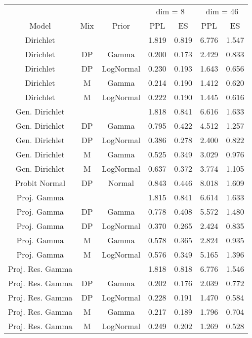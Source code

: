 
\begin{tabular}{ccccccc}
\toprule
\multicolumn{3}{c}{ } & \multicolumn{2}{c}{dim = 8} & \multicolumn{2}{c}{dim = 46} \\
\cmidrule(l{3pt}r{3pt}){4-5} \cmidrule(l{3pt}r{3pt}){6-7}
Model & Mix & Prior & PPL & ES & PPL & ES\\
\midrule
Dirichlet &  &  & 1.819 & 0.819 & 6.776 & 1.547\\
Dirichlet & DP & Gamma & 0.200 & 0.173 & 2.429 & 0.833\\
Dirichlet & DP & LogNormal & 0.230 & 0.193 & 1.643 & 0.656\\
Dirichlet & M & Gamma & 0.214 & 0.190 & 1.412 & 0.620\\
Dirichlet & M & LogNormal & 0.222 & 0.190 & 1.445 & 0.616\\
\addlinespace
Gen. Dirichlet &  &  & 1.818 & 0.841 & 6.616 & 1.633\\
Gen. Dirichlet & DP & Gamma & 0.795 & 0.422 & 4.512 & 1.257\\
Gen. Dirichlet & DP & LogNormal & 0.386 & 0.278 & 2.400 & 0.822\\
Gen. Dirichlet & M & Gamma & 0.525 & 0.349 & 3.029 & 0.976\\
Gen. Dirichlet & M & LogNormal & 0.637 & 0.372 & 3.774 & 1.105\\
\addlinespace
Probit Normal & DP & Normal & 0.843 & 0.446 & 8.018 & 1.609\\
Proj. Gamma &  &  & 1.815 & 0.841 & 6.614 & 1.633\\
Proj. Gamma & DP & Gamma & 0.778 & 0.408 & 5.572 & 1.480\\
Proj. Gamma & DP & LogNormal & 0.370 & 0.265 & 2.424 & 0.835\\
Proj. Gamma & M & Gamma & 0.578 & 0.365 & 2.824 & 0.935\\
\addlinespace
Proj. Gamma & M & LogNormal & 0.576 & 0.349 & 5.165 & 1.396\\
Proj. Res. Gamma &  &  & 1.818 & 0.818 & 6.776 & 1.546\\
Proj. Res. Gamma & DP & Gamma & 0.202 & 0.176 & 2.039 & 0.772\\
Proj. Res. Gamma & DP & LogNormal & 0.228 & 0.191 & 1.470 & 0.584\\
Proj. Res. Gamma & M & Gamma & 0.217 & 0.189 & 1.796 & 0.704\\
\addlinespace
Proj. Res. Gamma & M & LogNormal & 0.249 & 0.202 & 1.269 & 0.528\\
\bottomrule
\end{tabular}
